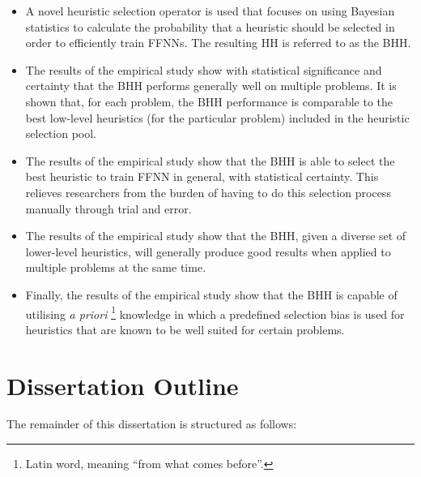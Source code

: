 \begin{itemize}
      \item
            A novel heuristic selection operator is used that focuses on using Bayesian
            statistics to calculate the probability that a heuristic should be selected
            in order to efficiently train \acp{FFNN}. The resulting \ac{HH} is referred
            to as the \Acl{BHH}.

      \item
            The results of the empirical study show  with statistical significance and certainty that the \Ac{BHH} performs generally
            well on multiple problems. It is shown that, for each problem, the \Ac{BHH} performance is comparable to the best low-level heuristics (for the particular problem) included in the heuristic selection pool.

      \item
            The results of the empirical study show that the \Ac{BHH} is able to select
            the best heuristic to train \ac{FFNN} in general, with statistical
            certainty. This relieves researchers from the burden of having to do this
            selection process manually through trial and error.

      \item
            The results of the empirical study show that the \Ac{BHH}, given a diverse
            set of lower-level heuristics, will generally produce good results when
            applied to multiple problems at the same time.

      \item
            Finally, the results of the empirical study show that the \Ac{BHH} is
            capable of utilising \textit{a priori} \footnote{Latin word, meaning ``from
                  what comes before''.} knowledge in which a predefined selection bias is used
            for heuristics that are known to be well suited for certain problems.
\end{itemize}


\section{Dissertation Outline}
\label{sec:introduction:outline}

The remainder of this dissertation is structured as follows:

